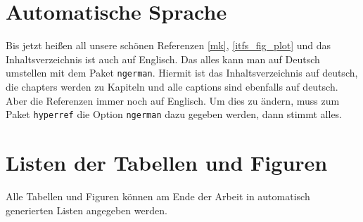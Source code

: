 
\section{Automatische Sprache}

Bis jetzt heißen all unsere schönen Referenzen \autoref{mk}, \autoref{itfs_fig_plot} und das Inhaltsverzeichnis ist auch auf Englisch. Das alles kann man auf Deutsch umstellen mit dem Paket \verb=ngerman=. Hiermit ist das Inhaltsverzeichnis auf deutsch, die chapters werden zu Kapiteln und alle captions sind ebenfalls auf deutsch. Aber die Referenzen immer noch auf Englisch. Um dies zu ändern, muss zum Paket \verb=hyperref= die Option \verb=ngerman= dazu gegeben werden, dann stimmt alles.


\section{Listen der Tabellen und Figuren}

Alle Tabellen und Figuren können am Ende der Arbeit in automatisch generierten Listen angegeben werden.